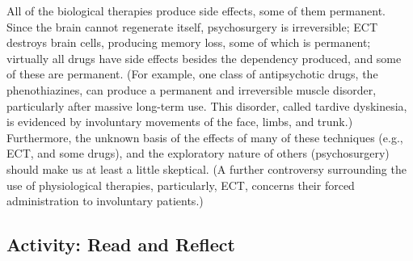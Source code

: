 \documentclass[
]{book}
\begin{document}
All of the biological therapies produce side effects, some of them permanent. Since the brain cannot regenerate itself, psychosurgery is irreversible; ECT destroys brain cells, producing memory loss, some of which is permanent; virtually all drugs have side effects besides the dependency produced, and some of these are permanent. (For example, one class of antipsychotic drugs, the phenothiazines, can produce a permanent and irreversible muscle disorder, particularly after massive long-term use. This disorder, called tardive dyskinesia, is evidenced by involuntary movements of the face, limbs, and trunk.) Furthermore, the unknown basis of the effects of many of these techniques (e.g., ECT, and some drugs), and the exploratory nature of others (psychosurgery) should make us at least a little skeptical. (A further controversy surrounding the use of physiological therapies, particularly, ECT, concerns their forced administration to involuntary patients.)

\hypertarget{activity-read-and-reflect-24}{%
\subsection*{Activity: Read and Reflect}\label{activity-read-and-reflect-24}}
\end{document}
